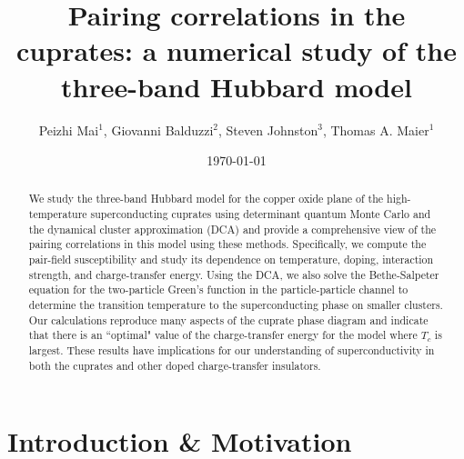\documentclass[reprint,nofootinbib,nobibnotes,amsmath,amssymb,aps,prb,floatfix]{revtex4-1}
\newcommand{\tJ}{$t$-$t'$-$J$ \ }
\begin{document}
\title{Pairing correlations in the cuprates: a numerical study of the three-band Hubbard model}
\author{ Peizhi Mai$^{1}$,  Giovanni Balduzzi$^{2}$, Steven Johnston$^{3}$, Thomas A. Maier$^{1}$ }
\date{\today}



\begin{abstract}
We study the three-band Hubbard model for the copper oxide plane of the high-temperature superconducting cuprates using determinant quantum Monte Carlo and the dynamical cluster approximation (DCA) and provide a comprehensive view of the pairing correlations in this model using these methods. Specifically, we compute the pair-field susceptibility and study its dependence on temperature, doping, interaction strength, and charge-transfer energy. Using the DCA, we also solve the Bethe-Salpeter equation for the two-particle Green's function in the particle-particle channel to determine the transition temperature to the superconducting phase on smaller clusters. Our calculations reproduce many aspects of the cuprate phase diagram and indicate that there is an ``optimal" value of the charge-transfer energy for the model where $T_c$ is largest. These results have implications for our understanding of superconductivity in both the cuprates and other doped charge-transfer insulators. 
\end{abstract}
\pacs{}
\maketitle

\section{Introduction \& Motivation}
\end{document}

